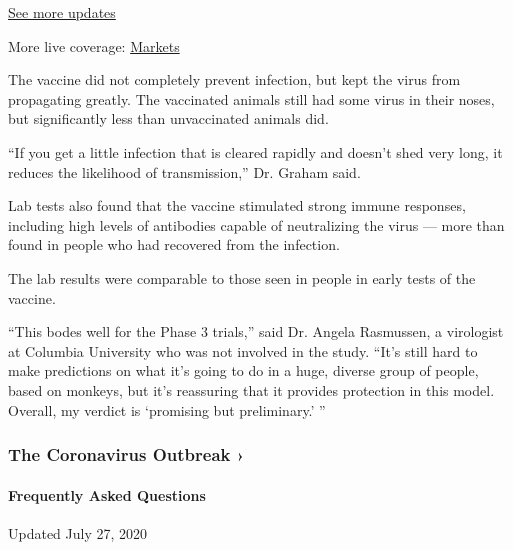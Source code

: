 \href{https://www.nytimes.com/2020/08/01/world/coronavirus-covid-19.html?action=click\&pgtype=Article\&state=default\&region=MAIN_CONTENT_1\&context=storylines_live_updates}{See
more updates}

More live coverage:
\href{https://www.nytimes.com/live/2020/07/31/business/stock-market-today-coronavirus?action=click\&pgtype=Article\&state=default\&region=MAIN_CONTENT_1\&context=storylines_live_updates}{Markets}

The vaccine did not completely prevent infection, but kept the virus
from propagating greatly. The vaccinated animals still had some virus in
their noses, but significantly less than unvaccinated animals did.

``If you get a little infection that is cleared rapidly and doesn't shed
very long, it reduces the likelihood of transmission,'' Dr. Graham said.

Lab tests also found that the vaccine stimulated strong immune
responses, including high levels of antibodies capable of neutralizing
the virus --- more than found in people who had recovered from the
infection.

The lab results were comparable to those seen in people in early tests
of the vaccine.

``This bodes well for the Phase 3 trials,'' said Dr. Angela Rasmussen, a
virologist at Columbia University who was not involved in the study.
``It's still hard to make predictions on what it's going to do in a
huge, diverse group of people, based on monkeys, but it's reassuring
that it provides protection in this model. Overall, my verdict is
`promising but preliminary.' ''

\href{https://www.nytimes.com/news-event/coronavirus?action=click\&pgtype=Article\&state=default\&region=MAIN_CONTENT_3\&context=storylines_faq}{}

\hypertarget{the-coronavirus-outbreak-}{%
\subsubsection{The Coronavirus Outbreak
›}\label{the-coronavirus-outbreak-}}

\hypertarget{frequently-asked-questions}{%
\paragraph{Frequently Asked
Questions}\label{frequently-asked-questions}}

Updated July 27, 2020

